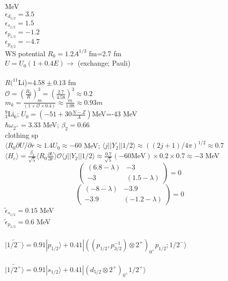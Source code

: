\documentclass[a4paper,12pt]{book}
\numberwithin{equation}{section}
\numberwithin{figure}{section}
\numberwithin{table}{section}
\begin{document}
MeV\\
$\epsilon_{d_{5/2}}=3.5$\\
$\epsilon_{s_{1/2}}=1.5$\\
$\epsilon_{p_{1/2}}=-1.2$\\
$\epsilon_{p_{3/2}}=-4.7$\\
WS potential $R_0=1.2A^{1/3}$ fm=2.7 fm\\
$U=U_0(1+0.4E)\to$ (exchange; Pauli)\\
\vspace{0.1cm}\\
$R(^{11}$Li)=$4.58\pm0.13$ fm\\
$\mathcal O=\left(\frac{R_0}{R}\right)^3=\left(\frac{2.7}{4.58}\right)^3\approx0.2$\\
$m_k=\frac{m}{(1+\mathcal O\times0.4)}\approx\frac{m}{1.08}\approx0.93 m$\\
$^9_3$Li$_6$; $U_0=\left(-51+30\frac{N-Z}{A}\right)$MeV=-43 MeV\\
$\hbar\omega_{2^+}=3.33$ MeV; $\beta_2=0.66$\\
clothing sp \\
$\langle R_0\partial U/\partial r\approx1.4 U_0\approx -60$ MeV; $\langle j||Y_2||1/2\rangle\approx((2j+1)/4\pi)^{1/2}\approx0.7$\\
$\langle H_c\rangle=\frac{\beta_2}{\sqrt{5}}\langle R_0\frac{\partial U}{\partial r}\rangle\mathcal O\langle j||Y_2||1/2\rangle\approx\frac{0.7}{\sqrt{5}}(-60\text{MeV})\times0.2\times0.7\approx-3 $ MeV
\begin{equation}
\left(\begin{array}{cc}
 (6.8-\lambda)& -3 \\ 
 -3 & (1.5-\lambda)
\end{array}\right)=0
\end{equation}
 \begin{equation}
 \left(\begin{array}{cc}
  (-8-\lambda)& -3.9 \\ 
  -3.9 & (-1.2-\lambda)
 \end{array}\right)=0
 \end{equation}
 $\tilde \epsilon_{s_{1/2}}=0.15$ MeV\\
 $\tilde \epsilon_{p_{1/2}}=0.6$ MeV\\
 \\
  $\widetilde{|1/2^-\rangle}=0.91|p_{1/2}\rangle+0.41|((p_{1/2},p^{-1}_{3/2})\otimes2^+)_{0^+}p_{1/2};1/2^-\rangle$\\
  \\
$\widetilde{|1/2^+\rangle}=0.91|s_{1/2}\rangle+0.41|(d_{5/2}\otimes2^+)_{0^+}1/2^+\rangle$\\
\end{document}

